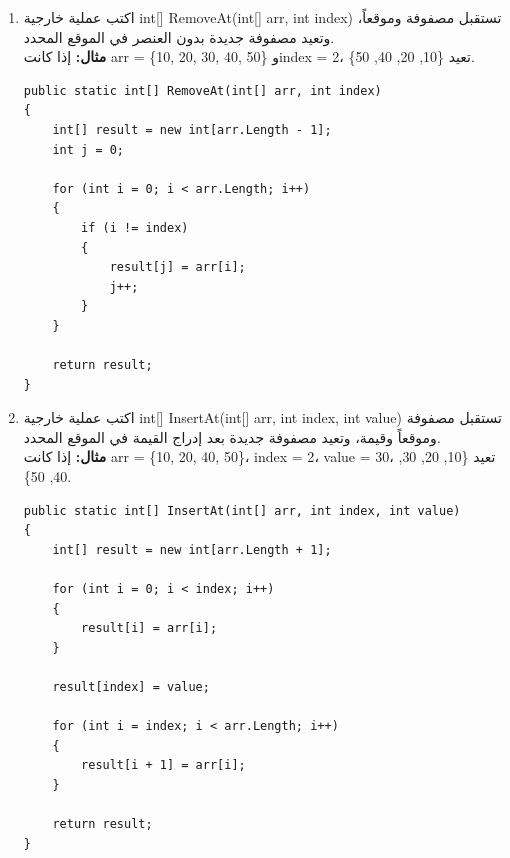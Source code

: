 \documentclass[14pt]{extarticle}
\begin{document}
\begin{enumerate}[resume, itemsep=2em]
    \item
    اكتب عملية خارجية \textenglish{int[] RemoveAt(int[] arr, int index)} تستقبل مصفوفة وموقعاً، وتعيد مصفوفة جديدة بدون العنصر في الموقع المحدد.\\
    \textbf{مثال:} إذا كانت \textenglish{arr = \{10, 20, 30, 40, 50\}} و\textenglish{index = 2}، تعيد \textenglish{\{10, 20, 40, 50\}}.
    \ifwithsols
    \begin{boxSolution}
    \begin{english}
    \begin{verbatim}
public static int[] RemoveAt(int[] arr, int index)
{
    int[] result = new int[arr.Length - 1];
    int j = 0;

    for (int i = 0; i < arr.Length; i++)
    {
        if (i != index)
        {
            result[j] = arr[i];
            j++;
        }
    }

    return result;
}
    \end{verbatim}
    \end{english}
    \end{boxSolution}
    \fi

    \item
    اكتب عملية خارجية \textenglish{int[] InsertAt(int[] arr, int index, int value)} تستقبل مصفوفة وموقعاً وقيمة، وتعيد مصفوفة جديدة بعد إدراج القيمة في الموقع المحدد.\\
    \textbf{مثال:} إذا كانت \textenglish{arr = \{10, 20, 40, 50\}}، \textenglish{index = 2}، \textenglish{value = 30}، تعيد \textenglish{\{10, 20, 30, 40, 50\}}.
    \ifwithsols
    \begin{boxSolution}
    \begin{english}
    \begin{verbatim}
public static int[] InsertAt(int[] arr, int index, int value)
{
    int[] result = new int[arr.Length + 1];

    for (int i = 0; i < index; i++)
    {
        result[i] = arr[i];
    }

    result[index] = value;

    for (int i = index; i < arr.Length; i++)
    {
        result[i + 1] = arr[i];
    }

    return result;
}
    \end{verbatim}
    \end{english}
    \end{boxSolution}
    \fi


\end{enumerate}
\end{document}
